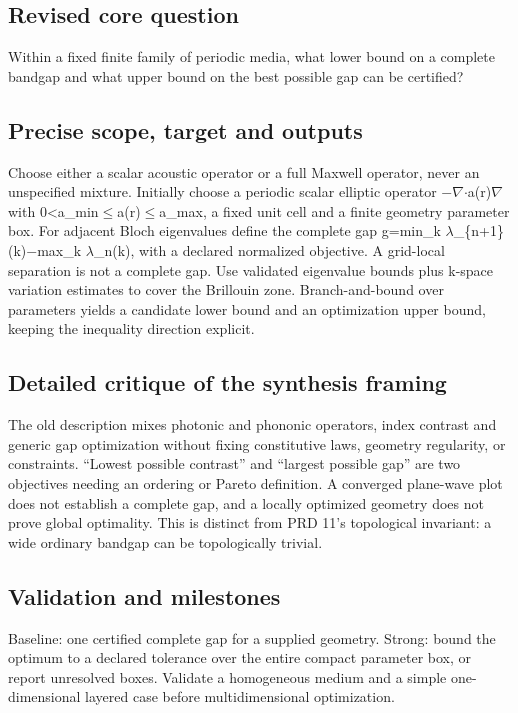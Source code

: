 \documentclass[
  11pt,
]{article}
\begin{document}
\subsection{Revised core question}

Within a fixed finite family of periodic media, what lower bound on a
complete bandgap and what upper bound on the best possible gap can be
certified?

\subsection{Precise scope, target and outputs}

Choose either a scalar acoustic operator or a full Maxwell operator,
never an unspecified mixture. Initially choose a periodic scalar
elliptic operator
\ensuremath{-}\ensuremath{\nabla}\ensuremath{\cdot}a(r)\ensuremath{\nabla}
with 0<a\_min\ensuremath{\le}a(r)\ensuremath{\le}a\_max, a fixed unit
cell and a finite geometry parameter box. For adjacent Bloch eigenvalues
define the complete gap g=min\_k
\ensuremath{\lambda}\_\{n+1\}(k)\ensuremath{-}max\_k
\ensuremath{\lambda}\_n(k), with a declared normalized objective. A
grid-local separation is not a complete gap. Use validated eigenvalue
bounds plus k-space variation estimates to cover the Brillouin zone.
Branch-and-bound over parameters yields a candidate lower bound and an
optimization upper bound, keeping the inequality direction explicit.

\subsection{Detailed critique of the synthesis framing}

The old description mixes photonic and phononic operators, index
contrast and generic gap optimization without fixing constitutive laws,
geometry regularity, or constraints. ``Lowest possible contrast'' and
``largest possible gap'' are two objectives needing an ordering or
Pareto definition. A converged plane-wave plot does not establish a
complete gap, and a locally optimized geometry does not prove global
optimality. This is distinct from PRD 11's topological invariant: a wide
ordinary bandgap can be topologically trivial.

\subsection{Validation and milestones}

Baseline: one certified complete gap for a supplied geometry. Strong:
bound the optimum to a declared tolerance over the entire compact
parameter box, or report unresolved boxes. Validate a homogeneous medium
and a simple one-dimensional layered case before multidimensional
optimization.
\end{document}
